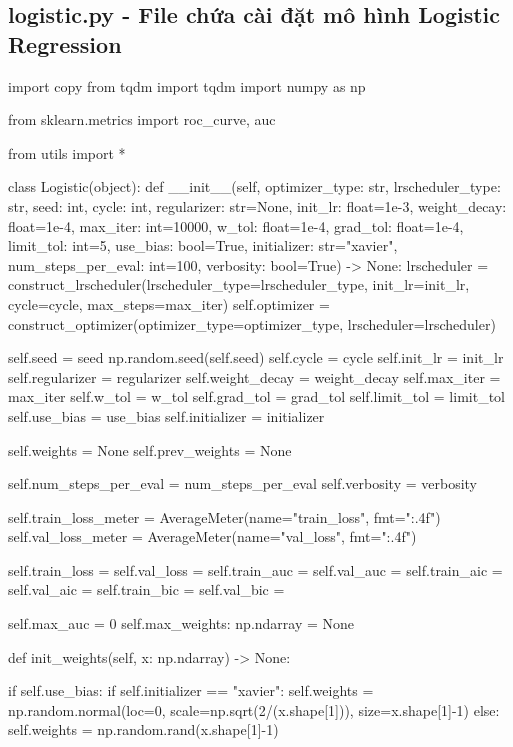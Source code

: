 \documentclass[14pt, a4paper]{article}
\theoremstyle{sltheorem}
\theoremstyle{soltheorem}
\begin{document}
\subsection{logistic.py - File chứa cài đặt mô hình Logistic Regression}
\begin{python}
import copy
from tqdm import tqdm
import numpy as np

from sklearn.metrics import roc_curve, auc

from utils import *


class Logistic(object):
    def __init__(self, optimizer_type: str, lrscheduler_type: str, seed: int, cycle: int, regularizer: str=None, init_lr: float=1e-3, weight_decay: float=1e-4, max_iter: int=10000, w_tol: float=1e-4, grad_tol: float=1e-4, limit_tol: int=5, use_bias: bool=True, initializer: str="xavier", num_steps_per_eval: int=100, verbosity: bool=True) -> None:
        lrscheduler = construct_lrscheduler(lrscheduler_type=lrscheduler_type, init_lr=init_lr, cycle=cycle, max_steps=max_iter)
        self.optimizer = construct_optimizer(optimizer_type=optimizer_type, lrscheduler=lrscheduler)
        
        self.seed = seed
        np.random.seed(self.seed)
        self.cycle = cycle
        self.init_lr = init_lr
        self.regularizer = regularizer
        self.weight_decay = weight_decay
        self.max_iter = max_iter
        self.w_tol = w_tol
        self.grad_tol = grad_tol
        self.limit_tol = limit_tol
        self.use_bias = use_bias
        self.initializer = initializer
        
        self.weights = None
        self.prev_weights = None
        
        self.num_steps_per_eval = num_steps_per_eval
        self.verbosity = verbosity
        
        self.train_loss_meter = AverageMeter(name="train_loss", fmt=":.4f")
        self.val_loss_meter = AverageMeter(name="val_loss", fmt=":.4f")
        
        self.train_loss = {}
        self.val_loss = {}
        self.train_auc = {}
        self.val_auc = {}
        self.train_aic = {}
        self.val_aic = {}
        self.train_bic = {}
        self.val_bic = {}
        
        self.max_auc = 0
        self.max_weights: np.ndarray = None
        
        
    def init_weights(self, x: np.ndarray) -> None:

        if self.use_bias:
            if self.initializer == "xavier":
                self.weights = np.random.normal(loc=0, scale=np.sqrt(2/(x.shape[1])), size=x.shape[1]-1)
            else:
                self.weights = np.random.rand(x.shape[1]-1)


\end{python}
\end{document}
